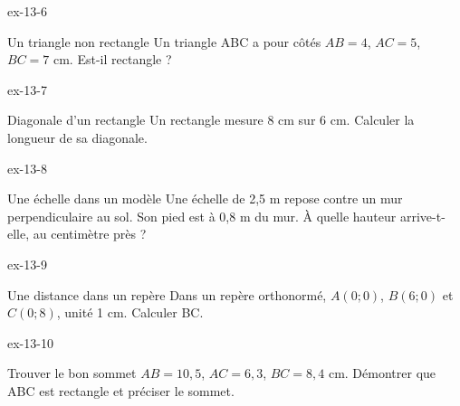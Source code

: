 \begin{blocLivre}{ex-13-6}\begin{exercice}[2]{Un triangle non rectangle}
Un triangle ABC a pour côtés $AB=4$, $AC=5$, $BC=7$ cm. Est-il rectangle ?
\label{fig-ex-13-6}
\end{exercice}\end{blocLivre}
\begin{blocLivre}{ex-13-7}\begin{exercice}[2]{Diagonale d’un rectangle}
Un rectangle mesure 8 cm sur 6 cm. Calculer la longueur de sa diagonale.
\label{fig-ex-13-7}
\end{exercice}\end{blocLivre}
\begin{blocLivre}{ex-13-8}\begin{exercice}[2]{Une échelle dans un modèle}
Une échelle de 2,5 m repose contre un mur perpendiculaire au sol. Son pied est à 0,8 m du mur. À quelle hauteur arrive-t-elle, au centimètre près ?
\label{fig-ex-13-8}
\end{exercice}\end{blocLivre}
\begin{blocLivre}{ex-13-9}\begin{exercice}[2]{Une distance dans un repère}
Dans un repère orthonormé, $A(0;0)$, $B(6;0)$ et $C(0;8)$, unité 1 cm. Calculer BC.
\label{fig-ex-13-9}
\end{exercice}\end{blocLivre}
\begin{blocLivre}{ex-13-10}\begin{exercice}[2]{Trouver le bon sommet}
$AB=10{,}5$, $AC=6{,}3$, $BC=8{,}4$ cm. Démontrer que ABC est rectangle et préciser le sommet.
\label{fig-ex-13-10}
\end{exercice}\end{blocLivre}

